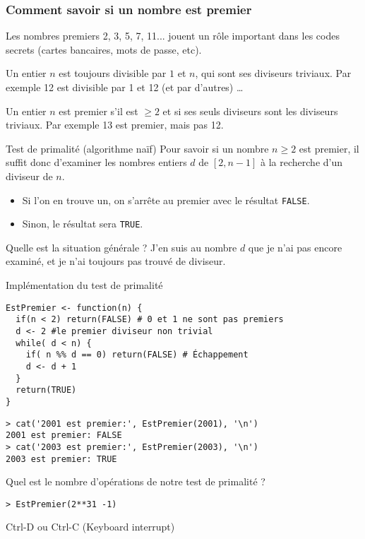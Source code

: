 \documentclass[10pt]{beamer}
\begin{document}
\begin{frame}
  \frametitle{Comment savoir si un nombre est premier}
Les nombres premiers 2, 3, 5, 7, 11... jouent un rôle important dans les codes secrets (cartes bancaires, mots de passe, etc).

Un entier $n$ est toujours divisible par $1$ et $n$, qui sont ses diviseurs triviaux.
Par exemple 12 est divisible par 1 et 12 (et par d'autres) \dots

Un entier $n$ est premier s'il est $\geq 2$ et si ses seuls diviseurs sont les diviseurs triviaux.
Par exemple 13 est premier, mais pas 12.

\begin{block}{Test de primalité (algorithme naïf)}
  Pour savoir si un nombre $n \geq 2$ est premier, il suffit donc d'examiner les nombres entiers $d$ de $[2,n-1]$ à la recherche d'un diviseur de $n$.
  \begin{itemize}
  \item Si l'on en trouve un, on s'arrête au premier avec le résultat \texttt{FALSE}.
  \item Sinon, le résultat sera \texttt{TRUE}.  

  \end{itemize}
\end{block}

\begin{block}{Quelle est la situation générale ?}
 J'en suis au nombre $d$ que je n'ai pas encore examiné, et je n'ai toujours pas trouvé de diviseur.  
\end{block}
\end{frame}
\begin{frame}[fragile]{Implémentation du test de primalité}
  \begin{lstlisting}[style=editor]
EstPremier <- function(n) {
  if(n < 2) return(FALSE) # 0 et 1 ne sont pas premiers
  d <- 2 #le premier diviseur non trivial
  while( d < n) {
    if( n %% d == 0) return(FALSE) # Échappement
    d <- d + 1
  }
  return(TRUE)
}    
\end{lstlisting}

\begin{lstlisting}
> cat('2001 est premier:', EstPremier(2001), '\n')
2001 est premier: FALSE
> cat('2003 est premier:', EstPremier(2003), '\n')
2003 est premier: TRUE
\end{lstlisting}

\begin{alertblock}{Quel est le nombre d'opérations de notre test de primalité ?}
  \begin{lstlisting}[style=edblock]
> EstPremier(2**31 -1)   
\end{lstlisting}
Ctrl-D ou Ctrl-C (Keyboard interrupt)
\end{alertblock}
\end{frame}
\end{document}
